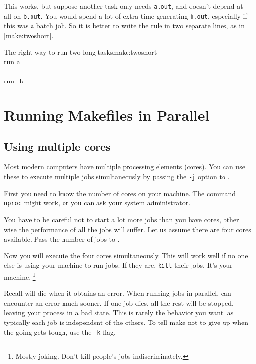 This works, but suppose another task only needs \texttt{a.out}, and doesn't depend at all on \texttt{b.out}. You would spend a lot of extra time generating \texttt{b.out}, especially if this was a batch job. So it is better to write the rule in two separate lines, as in \autoref{make:twoshort}.

\begin{make}{The right way to run two long tasks}{make:twoshort}
	 \\
	\tab run a \\
	
	 \\
	\tab run_b
\end{make}

\section{Running Makefiles in Parallel}

\subsection{Using multiple cores}

Most modern computers have multiple processing elements (cores). You can use these to execute multiple jobs simultaneously by passing the \texttt{-j} option to \maken.

First you need to know the number of cores on your machine. The command \texttt{nproc} might work, or you can ask your system administrator.

You have to be careful not to start a lot more jobs than you have cores, other wise the performance of all the jobs will suffer. Let us assume there are four cores available. Pass the number of jobs to \maken. 

Now you will execute the four cores simultaneously. This will work well if no one else is using your machine to run jobs. If they are, \texttt{kill} their jobs. It's your machine. \footnote{Mostly joking. Don't kill people's jobs indiscriminately.}

Recall \maken{} will die when it obtains an error. When running jobs in parallel, \maken{} can encounter an error much sooner. If one job dies, all the rest will be stopped, leaving your process in a bad state. This is rarely the behavior you want, as typically each job is independent of the others. To tell make not to give up when the going gets tough, use the \texttt{-k} flag.

